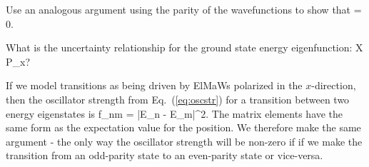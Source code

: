 \begin{exercise}
Use an analogous argument using the parity of the wavefunctions to show that
\beq
{} = 0.
\eeq
\end{exercise}

\begin{exercise}
What is the uncertainty relationship for the ground state energy eigenfunction:
\beq
\Delta X \Delta P_x?
\eeq
\end{exercise}

If we model transitions as being driven by ElMaWs polarized in the $x$-direction, then the oscillator strength from Eq.~(\ref{eq:oscstr}) for a transition between two energy eigenstates is
\beq
f_{nm} =  \left|E_n - E_m\right|^2.
\eeq
The matrix elements have the same form as the expectation value for the position. We therefore make the same argument - the only way the oscillator strength will be non-zero if if we make the transition from an odd-parity state to an even-parity state or vice-versa.

